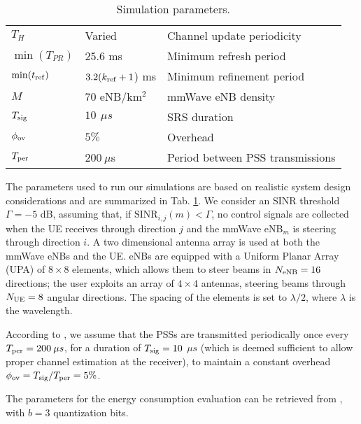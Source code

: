 \documentclass[conference]{IEEEtran}
\begin{document}
\begin{table}[!t]
\begin{tabular}{@{}lll@{}}
$T_{H}$ & Varied & Channel update periodicity\\

$\min (T_{PR})$ & $25.6$ ms & Minimum refresh period\\

$\min (t_{\rm ref})$ & $3.2(k_{\rm ref}+1$) ms & Minimum refinement period\\

$M$ & $70$ eNB/km$^2$ & mmWave eNB density \\

$T_{\rm sig}$ & $10 \, \: \mu s$& SRS duration \\

$\phi_{\rm ov}$ & $5\%$ & Overhead\\

$T_{\rm per}$ & $200 \: \mu$s & Period between PSS transmissions \\

\bottomrule
\end{tabular}
\caption{Simulation parameters.}
\label{tab:params}
\end{table}




The parameters used to run our simulations are based on realistic system design considerations and are summarized in Tab. \ref{tab:params}. We  consider an SINR threshold $\Gamma = -5$ dB, assuming that, if ${\text{SINR}_{i,j}(m) < \Gamma}$, no control signals are collected when the UE  receives through direction $j$  and the mmWave eNB$_m$ is steering through direction $i$.
 A two dimensional antenna array is used at both the mmWave eNBs and the UE.
eNBs are equipped with a Uniform Planar Array (UPA) of $8 \times 8$ elements, which allows them to steer beams in $N_{\rm eNB}=16$ directions; the user exploits an array of $4 \times 4$ antennas, steering beams through $N_{\rm UE}=8$ angular directions. The spacing of the elements is set to $\lambda/2$, where $\lambda$ is the wavelength.

According to \cite{Giordani_magazineIA_2016}, we assume that the PSSs  are transmitted periodically once every ${T_{\rm per} = 200 \: \mu s}$, for a duration of ${T_{\rm sig}=10}$ $\mu s$ (which is deemed sufficient to allow proper channel estimation at the receiver), to maintain a constant overhead  ${\phi_{\rm ov} = T_{\rm sig}/T_{\rm per} = 5 \%}$.

The parameters for the energy consumption evaluation can be retrieved from \cite{Waqas_EW2016,abbas2016_ECIA}, with $b=3$ quantization bits.
\end{document}

